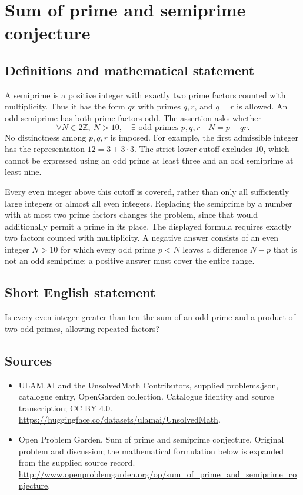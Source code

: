 \documentclass[11pt,a4paper]{article}
\begin{document}
\section*{Sum of prime and semiprime conjecture}\label{statement}

\subsection{Definitions and mathematical statement}
A semiprime is a positive integer with exactly two prime factors
counted with multiplicity. Thus it has the form $qr$ with primes
$q,r$, and $q=r$ is allowed. An odd semiprime has both prime factors
odd. The assertion asks whether
\[
 \forall N\in2\mathbb Z,\ N>10,\quad
 \exists\text{ odd primes }p,q,r\quad N=p+qr.
\]
No distinctness among $p,q,r$ is imposed. For example, the first
admissible integer has the representation $12=3+3\cdot3$.
The strict lower cutoff excludes $10$, which cannot be expressed
using an odd prime at least three and an odd semiprime at least nine.

Every even integer above this cutoff is covered, rather than only
all sufficiently large integers or almost all even integers. Replacing
the semiprime by a number with at most two prime factors changes the
problem, since that would additionally permit a prime in its place.
The displayed formula requires exactly two factors counted with
multiplicity. A negative answer consists of an even integer $N>10$
for which every odd prime $p<N$ leaves a difference $N-p$ that is
not an odd semiprime; a positive answer must cover the entire range.
\subsection{Short English statement}
Is every even integer greater than ten the sum of an odd prime and a product of two odd primes, allowing repeated factors?
\subsection{Sources}
\begin{itemize}
\item[S1] ULAM.AI and the UnsolvedMath Contributors, supplied problems.json, catalogue entry, OpenGarden collection. Catalogue identity and source transcription; CC BY 4.0.
\url{https://huggingface.co/datasets/ulamai/UnsolvedMath}.
\item[S2] Open Problem Garden, Sum of prime and semiprime conjecture. Original problem and discussion; the mathematical formulation below is expanded from the supplied source record.
\url{http://www.openproblemgarden.org/op/sum_of_prime_and_semiprime_conjecture}.
\end{itemize}
\end{document}
